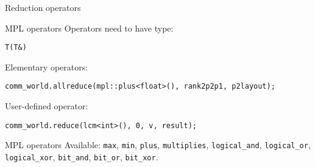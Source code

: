 \begin{numberedframe}{Reduction operators}
  \scriptsize
  
\end{numberedframe}

\begin{cxx}
\begin{mpl}
  \addtocounter{slidecount}{-1}

\begin{numberedframe}{MPL operators}
Operators need to have type:
\begin{lstlisting}[numbers=none]
T(T&)
\end{lstlisting}
Elementary operators:
\begin{lstlisting}[numbers=none]
comm_world.allreduce(mpl::plus<float>(), rank2p2p1, p2layout);
\end{lstlisting}
User-defined operator:
\begin{lstlisting}[numbers=none]
comm_world.reduce(lcm<int>(), 0, v, result);
\end{lstlisting}
\end{numberedframe}

\begin{numberedframe}{MPL operators}
    Available: \lstinline{max}, \lstinline{min}, \lstinline{plus}, \lstinline{multiplies},
  \lstinline{logical_and}, \lstinline{logical_or}, \lstinline{logical_xor},
  \lstinline{bit_and}, \lstinline{bit_or}, \lstinline{bit_xor}.

\end{numberedframe}
\end{mpl}
\end{cxx}

